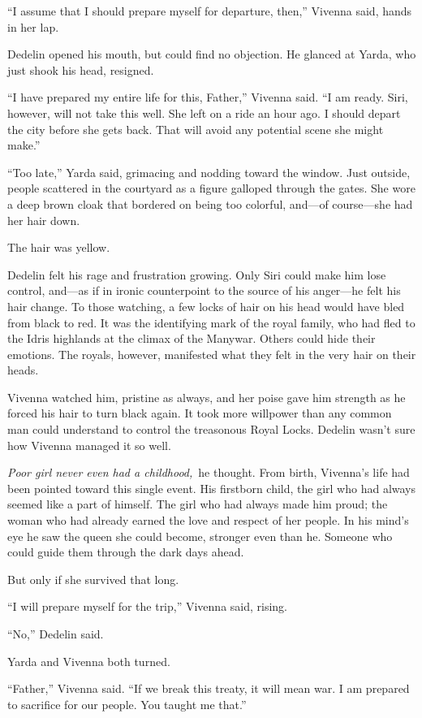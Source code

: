 “I assume that I should prepare myself for departure, then,” Vivenna said, hands in her lap.

Dedelin opened his mouth, but could find no objection. He glanced at Yarda, who just shook his head, resigned.

“I have prepared my entire life for this, Father,” Vivenna said. “I am ready. Siri, however, will not take this well. She left on a ride an hour ago. I should depart the city before she gets back. That will avoid any potential scene she might make.”

“Too late,” Yarda said, grimacing and nodding toward the window. Just outside, people scattered in the courtyard as a figure galloped through the gates. She wore a deep brown cloak that bordered on being too colorful, and—of course—she had her hair down.

The hair was yellow.

Dedelin felt his rage and frustration growing. Only Siri could make him lose control, and—as if in ironic counterpoint to the source of his anger—he felt his hair change. To those watching, a few locks of hair on his head would have bled from black to red. It was the identifying mark of the royal family, who had fled to the Idris highlands at the climax of the Manywar. Others could hide their emotions. The royals, however, manifested what they felt in the very hair on their heads.

Vivenna watched him, pristine as always, and her poise gave him strength as he forced his hair to turn black again. It took more willpower than any common man could understand to control the treasonous Royal Locks. Dedelin wasn’t sure how Vivenna managed it so well.

\textit{Poor girl never even had a childhood,}~he thought. From birth, Vivenna’s life had been pointed toward this single event. His firstborn child, the girl who had always seemed like a part of himself. The girl who had always made him proud; the woman who had already earned the love and respect of her people. In his mind’s eye he saw the queen she could become, stronger even than he. Someone who could guide them through the dark days ahead.

But only if she survived that long.

“I will prepare myself for the trip,” Vivenna said, rising.

“No,” Dedelin said.

Yarda and Vivenna both turned.

“Father,” Vivenna said. “If we break this treaty, it will mean war. I am prepared to sacrifice for our people. You taught me that.”

